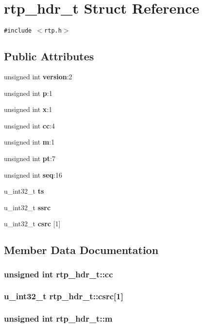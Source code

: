 \section{rtp\_\-hdr\_\-t Struct Reference}
\label{structrtp__hdr__t}
{\tt \#include $<$rtp.h$>$}

\subsection*{Public Attributes}
\begin{CompactItemize}
\item 
unsigned int {\bf version}:2
\item 
unsigned int {\bf p}:1
\item 
unsigned int {\bf x}:1
\item 
unsigned int {\bf cc}:4
\item 
unsigned int {\bf m}:1
\item 
unsigned int {\bf pt}:7
\item 
unsigned int {\bf seq}:16
\item 
u\_\-int32\_\-t {\bf ts}
\item 
u\_\-int32\_\-t {\bf ssrc}
\item 
u\_\-int32\_\-t {\bf csrc} [1]
\end{CompactItemize}


\subsection{Member Data Documentation}
\subsubsection{\setlength{\rightskip}{0pt plus 5cm}unsigned int {\bf rtp\_\-hdr\_\-t::cc}}\label{structrtp__hdr__t_o3}


\subsubsection{\setlength{\rightskip}{0pt plus 5cm}u\_\-int32\_\-t {\bf rtp\_\-hdr\_\-t::csrc}[1]}\label{structrtp__hdr__t_o9}


\subsubsection{\setlength{\rightskip}{0pt plus 5cm}unsigned int {\bf rtp\_\-hdr\_\-t::m}}\label{structrtp__hdr__t_o4}


